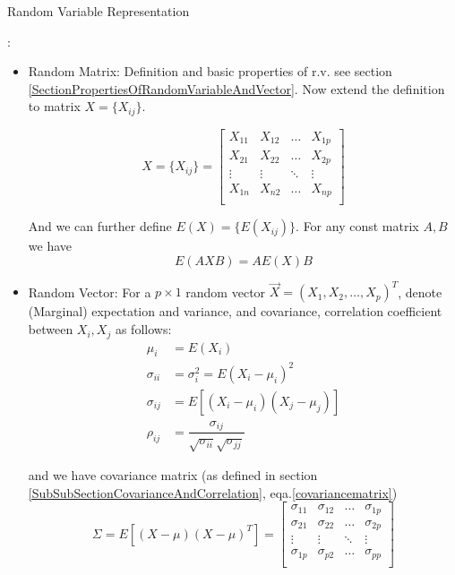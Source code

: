 \begin{point}
    \hypertarget{RandomVariableRepresentation}{Random Variable Representation}:
\end{point}
    \begin{itemize}[topsep=6pt,itemsep=4pt]
        \item Random Matrix: Definition and basic properties of r.v. see section \ref{SectionPropertiesOfRandomVariableAndVector}. Now extend the definition to matrix $ X=\{X_{ij}\} $. 
    
    \begin{equation}
        X=\{X_{ij}\}=\begin{bmatrix}
        X_{11}&X_{12}&\ldots&X_{1p}\\
        X_{21}&X_{22}&\ldots&X_{2p}\\
        \vdots&\vdots&\ddots&\vdots\\
        X_{1n}&X_{n2}&\ldots&X_{np}\\
        \end{bmatrix} 
    \end{equation}

    And we can further define $ E(X)=\{E(X_{ij})\} $.
    For any const matrix $ A,B $ we have
    \begin{equation}
        E(AXB)=AE(X)B 
    \end{equation}

    \item Random Vector: For a $ p\times 1 $ random vector $ \vec{X}=(X_{1},X_{2},\ldots,X_{p})^T  $, denote (Marginal) expectation and variance, and covariance, correlation coefficient between $ X_i,X_j $ as follows:
    \begin{align*}
        \mu_i&=E(X_i)\\
        \sigma _{ii}&=\sigma_i ^2=E(X_i-\mu_i)^2\\
        \sigma_{ij}&=E[(X_i-\mu_i)(X_j-\mu_j)]\\
        \rho _{ij}&=\dfrac{\sigma _{ij}}{\sqrt{\sigma _{ii}}\sqrt{\sigma _{jj}}}
    \end{align*}
    
    and we have covariance matrix (as defined in section \ref{SubSubSectionCovarianceAndCorrelation}, eqa.\ref{covariancematrix})
    \begin{equation}
        \Sigma =E[(X-\mu)(X-\mu)^T] =
        \begin{bmatrix}
        \sigma _{11}&\sigma _{12}&\ldots&\sigma _{1p}\\
        \sigma _{21}&\sigma _{22}&\ldots&\sigma _{2p}\\
        \vdots&\vdots&\ddots&\vdots\\
        \sigma _{1p}&\sigma _{p2}&\ldots&\sigma _{pp}\\
        \end{bmatrix}
    \end{equation}


\end{itemize}
